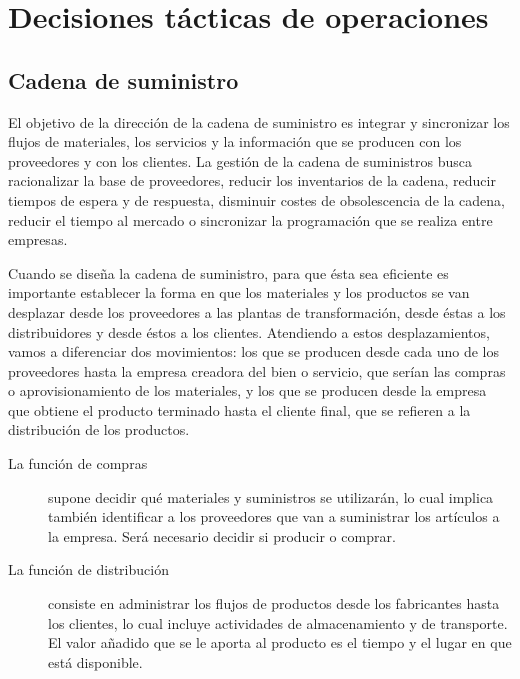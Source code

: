 \documentclass[10pt,a4paper,spanish]{report}
\begin{document}
      \section{\textcolor[rgb]{0.9,0.7,0.6}Decisiones tácticas de operaciones}

            \subsection{\textcolor[rgb]{0.9,0.7,0.6}Cadena de suministro}

                  El objetivo de la dirección de la cadena de suministro es integrar y sincronizar los flujos de materiales, los servicios y la información que se producen con los proveedores y con los clientes. La gestión de la cadena de suministros busca racionalizar la base de proveedores, reducir los inventarios de la cadena, reducir tiempos de espera y de respuesta, disminuir costes de obsolescencia de la cadena, reducir el tiempo al mercado o sincronizar la programación que se realiza entre empresas.

                  Cuando se diseña la cadena de suministro, para que ésta sea eficiente es importante establecer la forma en que los materiales y los productos se van desplazar desde los proveedores a las plantas de transformación, desde éstas a los distribuidores y desde éstos a los clientes. Atendiendo a estos desplazamientos, vamos a diferenciar dos movimientos: los que se producen desde cada uno de los proveedores hasta la empresa creadora del bien o servicio, que serían las compras o aprovisionamiento de los materiales, y los que se producen desde la empresa que obtiene el producto terminado hasta el cliente final, que se refieren a la distribución de los productos.

                  \begin{description}
                        \item[La función de compras] supone decidir qué materiales y suministros se utilizarán, lo cual implica también identificar a los proveedores que van a suministrar los artículos a la empresa. Será necesario decidir si producir o comprar.

                        \item[La función de distribución] consiste en administrar los flujos de productos desde los fabricantes hasta los clientes, lo cual incluye actividades de almacenamiento y de transporte. El valor añadido que se le aporta al producto es el tiempo y el lugar en que está disponible.
                  \end{description}
\end{document}
